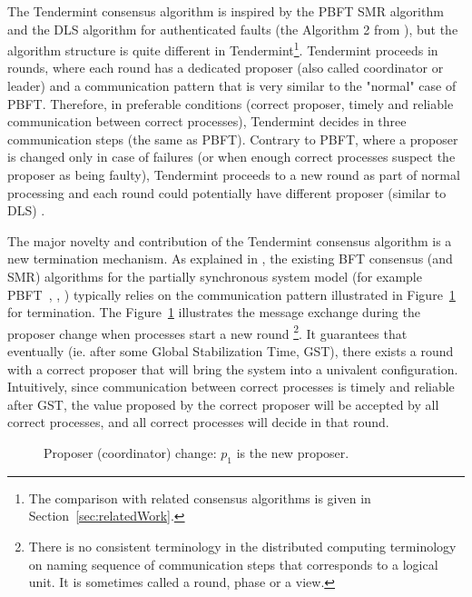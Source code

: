 The Tendermint consensus algorithm is inspired by the PBFT SMR algorithm~\cite{CL99:osdi} and the DLS algorithm for authenticated faults (the Algorithm 2 from \cite{DLS88:jacm}), but the algorithm structure is quite different in Tendermint\footnote{The comparison with related consensus algorithms is given in Section~\ref{sec:relatedWork}.}. Tendermint proceeds in rounds, where each round has a dedicated proposer (also called coordinator or leader) and a communication pattern that is very similar to the "normal" case of PBFT. Therefore, in preferable conditions (correct proposer, timely and reliable communication between correct processes), Tendermint decides in three communication steps (the same as PBFT). Contrary to PBFT, where a proposer is changed only in case of failures (or when enough correct processes suspect the proposer as being faulty), Tendermint proceeds to a new round as part of normal processing and each round could potentially have different proposer (similar to DLS) . 

The major novelty and contribution of the Tendermint consensus algorithm is a new termination mechanism. As explained in \cite{MHS09:opodis, RMS10:dsn}, the existing BFT consensus (and SMR) algorithms for the partially synchronous system model (for example PBFT~\cite{CL99:osdi}, \cite{DLS88:jacm}, \cite{MA06:tdsc}) typically relies on the communication pattern illustrated in Figure~\ref{ch3:fig:coordinator-change} for termination. The Figure~\ref{ch3:fig:coordinator-change} illustrates the message exchange during the proposer change when processes start a new round \footnote{There is no consistent terminology in the distributed computing terminology on naming sequence of communication steps that corresponds to a logical unit. It is sometimes called a round, phase or a view.}. It guarantees that eventually (ie. after some Global Stabilization Time, GST), there exists a round with a correct proposer that will bring the system into a univalent configuration. Intuitively, since communication between correct processes is timely and reliable after GST, the value proposed by the correct proposer will be accepted by all correct processes, and all correct processes will decide in that round.   

\begin{figure}[tbh!]
	\def\rdstretch{5}
	\def\ystretch{3}
	\centering
	\begin{rounddiag}{4}{2}
	\end{rounddiag}
	\vspace{-5mm}
	\caption{\boldmath Proposer (coordinator) change: $p_1$ is the new proposer.}
	\label{ch3:fig:coordinator-change}
\end{figure}  

